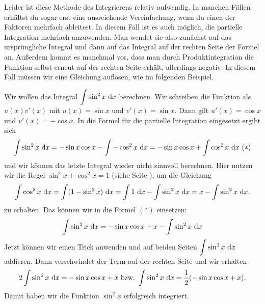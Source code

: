 \documentclass[../../main.tex]{subfiles}
\begin{document}
Leider ist diese Methode des Integrierens relativ aufwendig. In manchen Fällen erhältst du sogar erst eine ausreichende
Vereinfachung, wenn du einen der Faktoren mehrfach ableitest. In diesem Fall ist es auch möglich, die partielle Integration 
mehrfach anzuwenden. Man wendet sie also zunächst auf das ursprüngliche Integral und dann auf das Integral auf der 
rechten Seite der Formel an. Außerdem kommt es manchmal vor, dass man durch Produktintegration die Funktion selbst erneut 
auf der rechten Seite erhält, allerdings negativ. In diesem Fall müssen wir eine Gleichung auflösen, wie im folgenden 
Beispiel.

\begin{example}{}
    Wir wollen das Integral
    $\displaystyle\int \sin ^2 x\mathop{}\mathrm{d} x$
    berechnen. Wir schreiben die Funktion als $u(x)v'(x)$ mit $u(x)=\sin x$ und $v'(x)=\sin x$. Dann gilt $u'(x)=\cos x$ 
    und \mbox{$v'(x)=-\cos x$}. In die Formel für die partielle Integration eingesetzt ergibt sich 
    \[\int \sin ^2 x\mathop{}\mathrm{d} x=-\sin x\cos x-\int -\cos ^2 x\mathop{}\mathrm{d} x=-\sin x\cos x+\int \cos ^2 x\mathop{}\mathrm{d} x~(*)\]
    und wir können das letzte Integral wieder nicht sinnvoll berechnen. Hier nutzen wir die Regel $\sin ^2 x+\cos ^2 x=1$ 
    (siehe Seite \pageref{additionstheoreme}), um die Gleichung
    \[\int \cos ^2 x\mathop{}\mathrm{d} x=\int (1-\sin ^2 x)\mathop{}\mathrm{d} x=\int 1\mathop{}\mathrm{d} x-\int \sin ^2 x\mathop{}\mathrm{d} x=x-\int \sin ^2 x\mathop{}\mathrm{d} x.\]
    zu erhalten. Das können wir in die Formel $(*)$ einsetzen:
    \[\int \sin ^2 x\mathop{}\mathrm{d} x=-\sin x\cos x+x-\int \sin ^2 x\mathop{}\mathrm{d} x\]
    Jetzt können wir einen Trick anwenden und auf beiden Seiten $\displaystyle\int \sin ^2 x\mathop{}\mathrm{d} x$ addieren. Dann 
    verschwindet der Term auf der rechten Seite und wir erhalten
    \[2\int \sin ^2 x\mathop{}\mathrm{d} x=-\sin x\cos x+x~\text{bzw.}~\int \sin ^2 x\mathop{}\mathrm{d} x=\frac{1}{2}(-\sin x\cos x+x).\]
    Damit haben wir die Funktion $\sin^2 x$ erfolgreich integriert.
\end{example}
\end{document}
